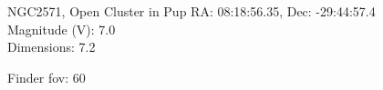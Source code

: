 \begin{block}{NGC2571, Open Cluster in Pup}
    RA: 08:18:56.35, Dec: -29:44:57.4 \\ 
    Magnitude (V): 7.0 \\ 
    Dimensions: 7.2 

    Finder fov: 60 
\end{block}
